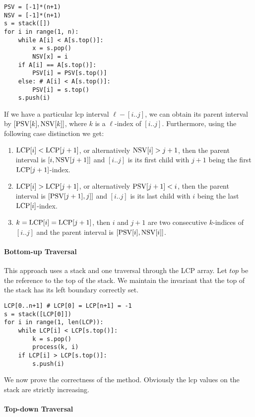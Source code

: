 \begin{verbatim}
PSV = [-1]*(n+1)
NSV = [-1]*(n+1)
s = stack([])
for i in range(1, n):
    while A[i] < A[s.top()]:
        x = s.pop()
        NSV[x] = i
    if A[i] == A[s.top()]:
        PSV[i] = PSV[s.top()]
    else: # A[i] < A[s.top()]:
        PSV[i] = s.top()
    s.push(i)
\end{verbatim}

If we have a particular lcp interval $\ell - [i..j]$, we can obtain its parent interval by $[\text{PSV}[k], \text{NSV}[k]]$, where $k$ is a $\ell$-index of $[i..j]$.
Furthermore, using the following case distinction we get:
\begin{enumerate}
    \item $\text{LCP}[i] < \text{LCP}[j+1]$, or alternatively $\text{NSV}[i] > j+1$, then the parent interval is $[i, \text{NSV}[j+1]]$ and $[i..j]$ is its first child with $j+1$ being the first $\text{LCP}[j+1]$-index.
    \item $\text{LCP}[i] > \text{LCP}[j+1]$, or alternatively $\text{PSV}[j+1] < i$, then the parent interval is $[\text{PSV}[j+1], j]]$ and $[i..j]$ is its last child with $i$ being the last $\text{LCP}[i]$-index.
    \item $k = \text{LCP}[i] = \text{LCP}[j+1]$, then $i$ and $j+1$ are two consecutive $k$-indices of $[i..j]$ and the parent interval is $[\text{PSV}[i], \text{NSV}[i]]$.
\end{enumerate}


\hypertarget{bottom-up-traversal}{%
\paragraph{Bottom-up Traversal}\label{bottom-up-traversal}}

This approach uses a stack and one traversal through the LCP array.
Let $top$ be the reference to the top of the stack.
We maintain the invariant that the top of the stack has its left boundary correctly set.

\begin{verbatim}
LCP[0..n+1] # LCP[0] = LCP[n+1] = -1
s = stack([LCP[0]])
for i in range(1, len(LCP)):
    while LCP[i] < LCP[s.top()]:
        k = s.pop()
        process(k, i)
    if LCP[i] > LCP[s.top()]:
        s.push(i)
\end{verbatim}

We now prove the correctness of the method. Obviously the lcp values on the stack are strictly increasing.

\hypertarget{top-down-traversal}{%
\paragraph{Top-down Traversal}\label{top-down-traversal}}

